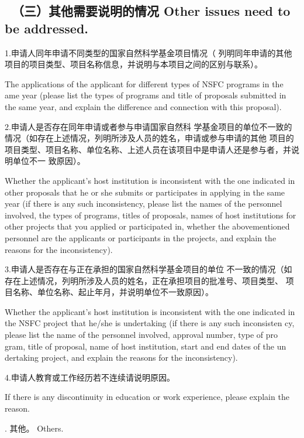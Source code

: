{\color{MsBlue} \subsection{\sihao \kaishu \quad \ \bfseries（三）其他需要说明的情况 
\xiaosihao {} Other issues need to be addressed.}}
%

{\sihao \color{MsBlue} \kaishu 1.申请人同年申请不同类型的国家自然科学基金项目情况（
列明同年申请的其他项目的项目类型、项目名称信息，并说明与本项目之间的区别与联系）。}

{\color{MsBlue} \xiaosihao {} 
The applications of the applicant for different types of NSFC programs in the 
ame year (please list the types of programs and title of proposals submitted 
in the same year, and explain the difference and connection with this proposal).}


{\sihao \color{MsBlue} \kaishu 2.申请人是否存在同年申请或者参与申请国家自然科
学基金项目的单位不一致的情况（如存在上述情况，列明所涉及人员的姓名，申请或参与申请的其他
项目的项目类型、项目名称、单位名称、上述人员在该项目中是申请人还是参与者，并说明单位不一
致原因）。}

{\color{MsBlue} \xiaosihao {} 
Whether the applicant's host institution is inconsistent with the one indicated 
in other proposals that he or she submits or participates in applying in the 
same year (if there is any such inconsistency, please list the names of the 
personnel involved, the types of programs, titles of proposals, names of host 
institutions for other projects that you applied or participated in, whether 
the abovementioned personnel are the applicants or participants in the projects, 
and explain the reasons for the inconsistency).}


{\sihao \color{MsBlue} \kaishu 3.申请人是否存在与正在承担的国家自然科学基金项目的单位
不一致的情况（如存在上述情况，列明所涉及人员的姓名，正在承担项目的批准号、项目类型、
项目名称、单位名称、起止年月，并说明单位不一致原因）。}

{\color{MsBlue} \xiaosihao {} 
Whether the applicant's host institution is inconsistent with the one indicated 
in the NSFC project that he/she is undertaking (if there is any such inconsisten
cy, please list the name of the personnel involved, approval number, type of pro
gram, title of proposal, name of host institution, start and end dates of the un
dertaking project, and explain the reasons for the inconsistency).}


{\sihao \color{MsBlue} \kaishu 4.申请人教育或工作经历若不连续请说明原因。}

{\color{MsBlue} \xiaosihao {} 
If there is any discontinuity in education or work experience, please explain 
the reason.}

{\sihao \color{MsBlue} . 其他。 
\xiaosihao {} Others.}


